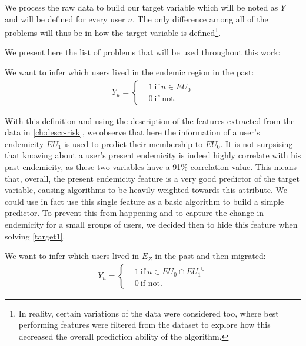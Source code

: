 We process the raw data to build our target variable which will be noted as $Y$ and will be defined for every user $u$.
The only difference among all of the problems will thus be in how the target variable is defined\footnote{In reality, certain variations of the data were considered too, where best performing features were filtered from the dataset to explore how this decreased the overall prediction ability of the algorithm.}.


We present here the list of problems that will be used throughout this work:


\begin{problem}\label{target1}
We want to infer which users lived in the endemic region in the past:
		\begin{align*}
		Y_u =
		\begin{cases}
		&1 \ \mbox{if} \ u \in EU_{0} \\
		&0 \ \mbox{if not}.
		\end{cases}
		\end{align*}
\end{problem}

With this definition and using the description of the features extracted from the data in \cref{ch:descr-risk}, we observe that here the information of a user's endemicity $EU_{1}$ is used to predict their membership to $EU_{0}$.
It is not surpsising that knowing about a user's present endemicity is indeed highly correlate with his past endemicity, as these two variables have a 91\% correlation value.
This means that, overall, the present endemicity feature is a very good predictor of the target variable, causing algorithms to be heavily weighted towards this attribute.
We could use in fact use this single feature as a basic algorithm to build a simple predictor.
To prevent this from happening and to capture the change in endemicity for a small groups of users, we decided then to hide this feature when solving \cref{target1}.



\begin{problem}\label{target2}
We want to infer which users lived in $E_Z$ in the past and then migrated:
	\begin{align*}
				Y_u =
				\begin{cases}
					&1 \ \mbox{if} \ u \in EU_{0} \cap { EU_{1} }^{\complement}  \\
					&0 \ \mbox{if not}.
				\end{cases}
			\end{align*}
\end{problem}

